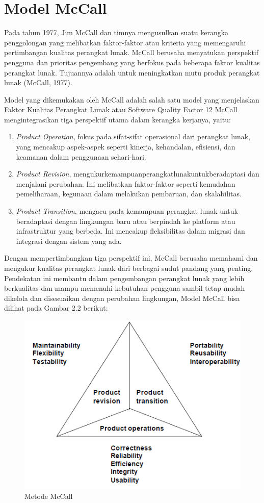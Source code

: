 \section{Model McCall}
Pada tahun 1977, Jim McCall dan timnya mengusulkan suatu kerangka penggolongan yang melibatkan faktor-faktor atau kriteria yang memengaruhi pertimbangan kualitas perangkat lunak. McCall berusaha menyatukan perspektif pengguna dan prioritas pengembang yang berfokus pada beberapa faktor kualitas perangkat lunak. Tujuannya adalah untuk meningkatkan mutu produk perangkat lunak (McCall, 1977).

Model yang dikemukakan oleh McCall adalah salah satu model yang menjelaskan Faktor Kualitas Perangkat Lunak atau Software Quality Factor 12 McCall mengintegrasikan tiga perspektif utama dalam kerangka kerjanya, yaitu: 
\begin{enumerate}
	\item \textit{Product Operation}, fokus pada sifat-sifat operasional dari perangkat lunak, yang mencakup aspek-aspek seperti kinerja, kehandalan, efisiensi, dan keamanan dalam penggunaan sehari-hari. 
	\item \textit{Product Revision}, mengukurkemampuanperangkatlunakuntukberadaptasi dan menjalani perubahan. Ini melibatkan faktor-faktor seperti kemudahan pemeliharaan, kegunaan dalam melakukan pembaruan, dan skalabilitas. 
	\item \textit{Product Transition}, mengacu pada kemampuan perangkat lunak untuk beradaptasi dengan lingkungan baru atau berpindah ke platform atau infrastruktur yang berbeda. Ini mencakup fleksibilitas dalam migrasi dan integrasi dengan sistem yang ada.
\end{enumerate}

Dengan mempertimbangkan tiga perspektif ini, McCall berusaha memahami dan mengukur kualitas perangkat lunak dari berbagai sudut pandang yang penting. Pendekatan ini membantu dalam pengembangan perangkat lunak yang lebih berkualitas dan mampu memenuhi kebutuhan pengguna sambil tetap mudah dikelola dan disesuaikan dengan perubahan lingkungan, Model McCall bisa dilihat pada Gambar 2.2 berikut: 

\begin{figure}
  \centering
  \includegraphics[width=0.82\linewidth]{konten//gambar/Metode McCall.png}
  \caption{Metode McCall}
  \label{fig:enter-label}
\end{figure}

